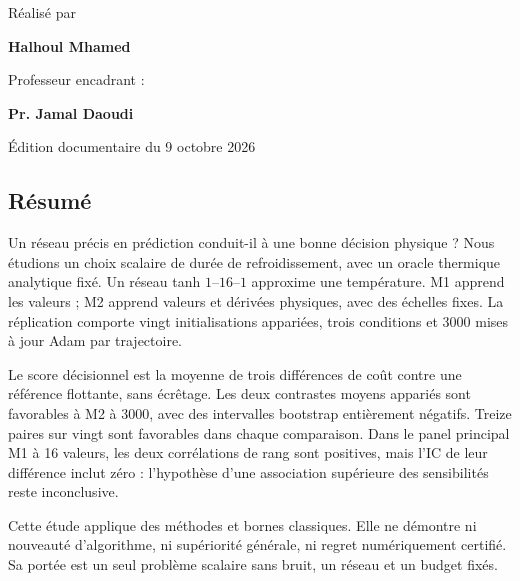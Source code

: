 \documentclass[11pt,a4paper]{article}
\begin{document}
\begin{titlepage}
\begin{center}
\end{center}
\vfill
\begin{minipage}[t]{0.45\linewidth}
{\small\color{coverteal} Réalisé par\par}
\vspace{0.12cm}
{\large\bfseries Halhoul Mhamed\par}
\end{minipage}\hfill
\begin{minipage}[t]{0.45\linewidth}
\raggedleft
{\small\color{coverteal} Professeur encadrant :\par}
\vspace{0.12cm}
{\large\bfseries Pr. Jamal Daoudi\par}
\end{minipage}
\par\vspace{0.35cm}
{\small Édition documentaire du 9 octobre 2026\par}
\vspace{0.6cm}
\end{titlepage}
\setcounter{page}{1}
\hypersetup{pageanchor=true}
\subsection*{Résumé}
Un réseau précis en prédiction conduit-il à une bonne décision physique ?
Nous étudions un choix scalaire de durée de refroidissement, avec un oracle
thermique analytique fixé. Un réseau tanh $1$--$16$--$1$ approxime une température.
M1 apprend les valeurs ; M2 apprend valeurs et dérivées physiques, avec des
échelles fixes. La réplication comporte vingt initialisations appariées,
trois conditions et 3000 mises à jour Adam par trajectoire.

Le score décisionnel est la moyenne de trois différences de coût contre une
référence flottante, sans écrêtage. Les deux contrastes moyens appariés sont
favorables à M2 à 3000, avec des intervalles bootstrap entièrement négatifs.
Treize paires sur vingt sont favorables dans chaque comparaison.
Dans le panel principal M1 à 16 valeurs, les deux corrélations de rang sont
positives, mais l'IC de leur différence inclut zéro : l'hypothèse d'une
association supérieure des sensibilités reste inconclusive.

Cette étude applique des méthodes et bornes classiques. Elle ne démontre
ni nouveauté d'algorithme, ni supériorité générale, ni regret numériquement
certifié. Sa portée est un seul problème scalaire sans bruit, un réseau
et un budget fixés.
\end{document}
